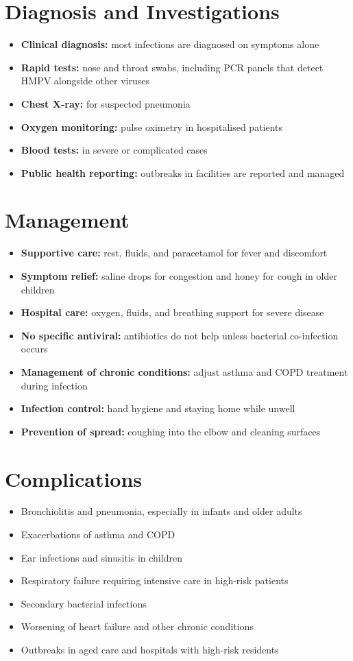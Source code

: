 \section*{Diagnosis and Investigations}
\begin{itemize}
    \item \textbf{Clinical diagnosis:} most infections are diagnosed on symptoms alone
    \item \textbf{Rapid tests:} nose and throat swabs, including PCR panels that detect HMPV alongside other viruses
    \item \textbf{Chest X-ray:} for suspected pneumonia
    \item \textbf{Oxygen monitoring:} pulse oximetry in hospitalised patients
    \item \textbf{Blood tests:} in severe or complicated cases
    \item \textbf{Public health reporting:} outbreaks in facilities are reported and managed
\end{itemize}

\section*{Management}
\begin{itemize}
    \item \textbf{Supportive care:} rest, fluids, and paracetamol for fever and discomfort
    \item \textbf{Symptom relief:} saline drops for congestion and honey for cough in older children
    \item \textbf{Hospital care:} oxygen, fluids, and breathing support for severe disease
    \item \textbf{No specific antiviral:} antibiotics do not help unless bacterial co-infection occurs
    \item \textbf{Management of chronic conditions:} adjust asthma and COPD treatment during infection
    \item \textbf{Infection control:} hand hygiene and staying home while unwell
    \item \textbf{Prevention of spread:} coughing into the elbow and cleaning surfaces
\end{itemize}

\section*{Complications}
\begin{itemize}
    \item Bronchiolitis and pneumonia, especially in infants and older adults
    \item Exacerbations of asthma and COPD
    \item Ear infections and sinusitis in children
    \item Respiratory failure requiring intensive care in high-risk patients
    \item Secondary bacterial infections
    \item Worsening of heart failure and other chronic conditions
    \item Outbreaks in aged care and hospitals with high-risk residents
\end{itemize}

